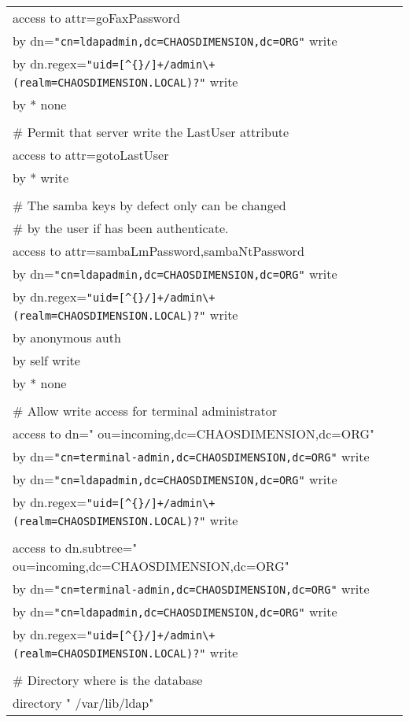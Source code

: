 \begin{center}
\begin{longtable}{|ll|}
access to attr=goFaxPassword & \\
	by dn=\verb|"cn=ldapadmin,dc=CHAOSDIMENSION,dc=ORG"| write & \\
	by dn.regex=\verb|"uid=[^{}/]+/admin\+(realm=CHAOSDIMENSION.LOCAL)?"| write & \\
	by * none  & \\
 & \\
\# Permit that server write the LastUser attribute & \\
access to attr=gotoLastUser & \\
	by * write & \\
 & \\
\# The samba keys by defect only can be changed & \\
\# by the user if has been authenticate. & \\
access to attr=sambaLmPassword,sambaNtPassword & \\
	by dn=\verb|"cn=ldapadmin,dc=CHAOSDIMENSION,dc=ORG"| write & \\
	by dn.regex=\verb|"uid=[^{}/]+/admin\+(realm=CHAOSDIMENSION.LOCAL)?"| write & \\
	by anonymous auth & \\
	by self write & \\
	by * none & \\
 & \\
\# Allow write access for terminal administrator & \\
access to dn=" ou=incoming,dc=CHAOSDIMENSION,dc=ORG"  & \\
	by dn=\verb|"cn=terminal-admin,dc=CHAOSDIMENSION,dc=ORG"| write & \\
	by dn=\verb|"cn=ldapadmin,dc=CHAOSDIMENSION,dc=ORG"| write & \\
	by dn.regex=\verb|"uid=[^{}/]+/admin\+(realm=CHAOSDIMENSION.LOCAL)?"| write & \\
 & \\
access to dn.subtree=" ou=incoming,dc=CHAOSDIMENSION,dc=ORG"  & \\
	by dn=\verb|"cn=terminal-admin,dc=CHAOSDIMENSION,dc=ORG"| write & \\
	by dn=\verb|"cn=ldapadmin,dc=CHAOSDIMENSION,dc=ORG"| write & \\
	by dn.regex=\verb|"uid=[^{}/]+/admin\+(realm=CHAOSDIMENSION.LOCAL)?"| write & \\
 & \\
\# Directory where is the database & \\
directory       " /var/lib/ldap"  & \\

\end{longtable}
\end{center}
